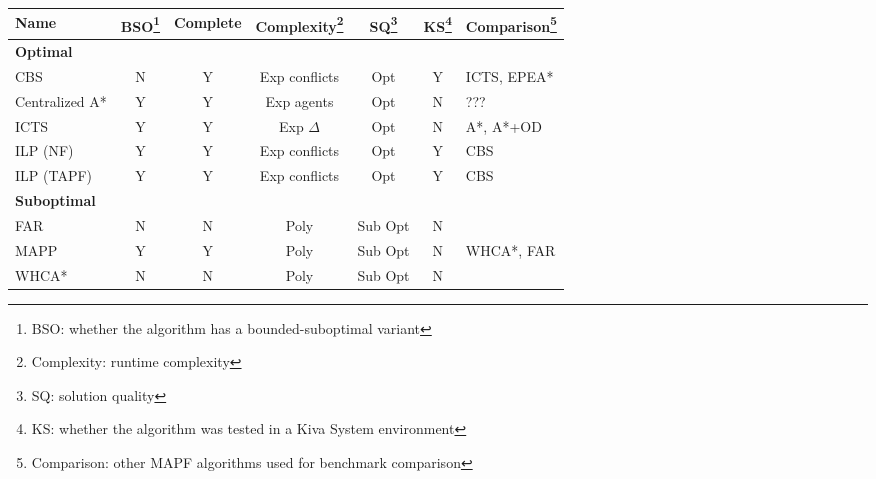 \documentclass[a4paper,11pt]{article}
\begin{document}
\begin{table}
\centering
\small
\begin{tabular}{ l c c c c c p{2.3cm} }
	\textbf{Name} & \textbf{BSO}\footnote{BSO: whether the algorithm has a bounded-suboptimal variant}  & \textbf{Complete} & \textbf{Complexity\footnote{Complexity: runtime complexity}} & \textbf{SQ\footnote{SQ: solution quality}} & \textbf{KS}\footnote{KS: whether the algorithm was tested in a Kiva System environment} & \textbf{Comparison}\footnote{Comparison: other MAPF algorithms used for benchmark comparison} \\
	\hline
	\multicolumn{7}{l}{\textbf{Optimal}} \\
	\hline
	CBS 				& N & Y & Exp conflicts & Opt & Y & ICTS, EPEA* \\
	Centralized A* 		& Y & Y & Exp agents & Opt & N & ??? \\
	ICTS 				& Y & Y & Exp $\Delta$ & Opt & N & A*, A*+OD \\
	ILP	(NF)			& Y & Y & Exp conflicts & Opt & Y & CBS \\
	ILP	(TAPF)			& Y & Y & Exp conflicts & Opt & Y & CBS \\
	\hline
	\multicolumn{7}{l}{\textbf{Suboptimal}} \\
	\hline
	FAR  				& N & N & Poly & Sub Opt & N & \\
	MAPP 				& Y & Y & Poly & Sub Opt & N & WHCA*, FAR \\
	WHCA* 				& N & N & Poly & Sub Opt & N & \\
	
	
\end{tabular}
\end{table}



	
\end{document}
